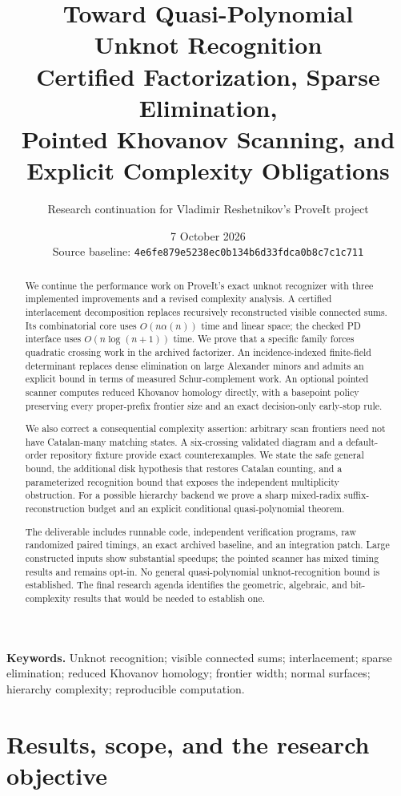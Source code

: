 \documentclass[11pt,a4paper]{article}
\title{\color{navy}\bfseries Toward Quasi-Polynomial\\Unknot Recognition\\[6pt]
  \large Certified Factorization, Sparse Elimination,\\
  Pointed Khovanov Scanning, and Explicit Complexity Obligations}
\author{Research continuation for Vladimir Reshetnikov's ProveIt project}
\date{7 October 2026\\[3pt]\small Source baseline:
  \texttt{4e6fe879e5238ec0b134b6d33fdca0b8c7c1c711}}
\theoremstyle{definition}
\theoremstyle{remark}
\begin{document}
\maketitle
\begin{abstract}
We continue the performance work on ProveIt's exact unknot recognizer with
three implemented improvements and a revised complexity analysis.  A certified
interlacement decomposition replaces recursively reconstructed visible
connected sums.  Its combinatorial core uses $O(n\alpha(n))$ time and linear
space; the checked PD interface uses $O(n\log(n+1))$ time.  We prove that a
specific family forces quadratic crossing work in the archived factorizer.
An incidence-indexed finite-field determinant replaces dense elimination on
large Alexander minors and admits an explicit bound in terms of measured
Schur-complement work.  An optional pointed scanner computes reduced Khovanov
homology directly, with a basepoint policy preserving every proper-prefix
frontier size and an exact decision-only early-stop rule.

We also correct a consequential complexity assertion: arbitrary scan frontiers
need not have Catalan-many matching states.  A six-crossing validated diagram
and a default-order repository fixture provide exact counterexamples.  We
state the safe general bound, the additional disk hypothesis that restores
Catalan counting, and a parameterized recognition bound that exposes the
independent multiplicity obstruction.  For a possible hierarchy backend we
prove a sharp mixed-radix suffix-reconstruction budget and an explicit
conditional quasi-polynomial theorem.

The deliverable includes runnable code, independent verification programs,
raw randomized paired timings, an exact archived baseline, and an integration
patch.  Large constructed inputs show substantial speedups; the pointed
scanner has mixed timing results and remains opt-in.  No general
quasi-polynomial unknot-recognition bound is established.  The final research
agenda identifies the geometric, algebraic, and bit-complexity results that
would be needed to establish one.
\end{abstract}
\vspace{5pt}
\noindent\textbf{Keywords.} Unknot recognition; visible connected sums;
interlacement; sparse elimination; reduced Khovanov homology; frontier width;
normal surfaces; hierarchy complexity; reproducible computation.
\clearpage
\tableofcontents
\clearpage

\section{Results, scope, and the research objective}
\label{sec:introduction}
\end{document}
